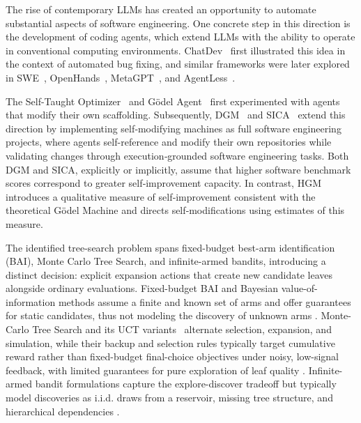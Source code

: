 \documentclass{article}
\begin{document}
The rise of contemporary LLMs has created an opportunity to automate substantial aspects of software engineering. One concrete step in this direction is the development of coding agents, which extend LLMs with the ability to operate in conventional computing environments. ChatDev~\citep{qian2023chatdev} first illustrated this idea in the context of automated bug fixing, and similar frameworks were later explored in SWE~\citet{yang2024swe}, OpenHands~\citep{wang2024openhands}, MetaGPT~\citep{hong2024metagpt}, and AgentLess~\citep{xia2025demystifying}.

The Self-Taught Optimizer~\citep{zelikmanSelfTaughtOptimizerSTOP2024} and G\"odel Agent~\citep{yin2024g} first experimented with agents that modify their own scaffolding.
Subsequently, DGM~\citep{zhang2025dgm} and SICA~\citep{robeyns2025selfimprovingcodingagent} extend this direction by implementing self‑modifying machines as full software engineering projects, where agents self-reference and modify their own repositories while validating changes through execution‑grounded software engineering tasks.
Both DGM and SICA, explicitly or implicitly, assume that higher software benchmark scores correspond to greater self‑improvement capacity. In contrast, HGM introduces a qualitative measure of self‑improvement consistent with the theoretical G\"odel Machine and directs self‑modifications using estimates of this measure.

The identified tree-search problem spans fixed-budget best-arm identification (BAI), Monte Carlo Tree Search, and infinite-armed bandits, introducing a distinct decision: explicit expansion actions that create new candidate leaves alongside ordinary evaluations. Fixed-budget BAI and Bayesian value-of-information methods assume a finite and known set of arms and offer guarantees for static candidates, thus not modeling the discovery of unknown arms \citep{audibert2010best,karnin2013almost,frazier2008knowledge}. Monte-Carlo Tree Search and its UCT variants~\citep{coulom2006efficient,kocsis2006bandit} alternate selection, expansion, and simulation, while their backup and selection rules typically target cumulative reward rather than fixed-budget final-choice objectives under noisy, low-signal feedback, with limited guarantees for pure exploration of leaf quality \citep{kaufmann2017monte}. Infinite-armed bandit formulations capture the explore-discover tradeoff but typically model discoveries as i.i.d. draws from a reservoir, missing tree structure, and hierarchical dependencies \citep{NIPS200849ae49a2,bubeck2011pure,carpentier2015simple}.
\end{document}
